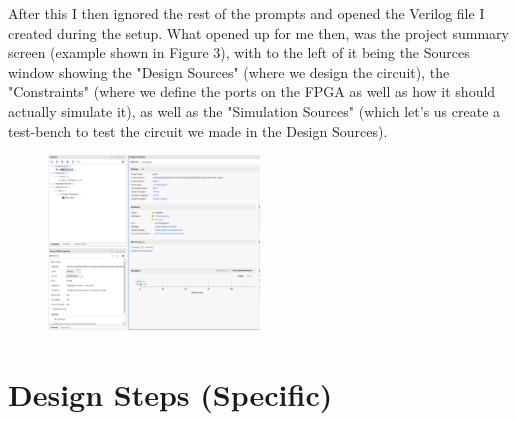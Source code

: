 \documentclass{article}
\begin{document}
After this I then ignored the rest of the prompts and opened the Verilog file I created during the setup. What opened up for me then, was the project summary screen (example shown in Figure 3), with to the left of it being the Sources window showing the "Design Sources" (where we design the circuit), the "Constraints" (where we define the ports on the FPGA as well as how it should actually simulate it), as well as the "Simulation Sources" (which let's us create a test-bench to test the circuit we made in the Design Sources).\\
\begin{figure}[!htbp]
    \centering
    \caption{}
    \includegraphics[width=0.5\textwidth]{figure_3_3.png}
    \label{Figure 3.3}
\end{figure}
\newpage
\section{Design Steps (Specific)}
\end{document}
